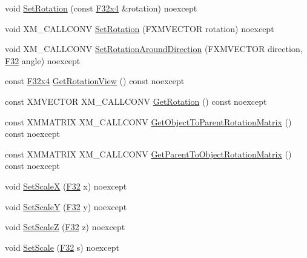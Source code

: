 \begin{DoxyCompactItemize}
\item 
void \mbox{\hyperlink{classmage_1_1_s_q_t_transform3_d_a63dfbd5a54920f65922bb3198043a79c}{Set\+Rotation}} (const \mbox{\hyperlink{namespacemage_a851648f37dfb126a2d2f973e102861ad}{F32x4}} \&rotation) noexcept
\item 
void X\+M\+\_\+\+C\+A\+L\+L\+C\+O\+NV \mbox{\hyperlink{classmage_1_1_s_q_t_transform3_d_aab4a582724596a859f5c338dcc9205d4}{Set\+Rotation}} (F\+X\+M\+V\+E\+C\+T\+OR rotation) noexcept
\item 
void X\+M\+\_\+\+C\+A\+L\+L\+C\+O\+NV \mbox{\hyperlink{classmage_1_1_s_q_t_transform3_d_aa0d6c5b3ab47a3b8c0f03edc41f93bc6}{Set\+Rotation\+Around\+Direction}} (F\+X\+M\+V\+E\+C\+T\+OR direction, \mbox{\hyperlink{namespacemage_aa97e833b45f06d60a0a9c4fc22ae02c0}{F32}} angle) noexcept
\item 
const \mbox{\hyperlink{namespacemage_a851648f37dfb126a2d2f973e102861ad}{F32x4}} \mbox{\hyperlink{classmage_1_1_s_q_t_transform3_d_ae7d2f97b41f53c23919e208bfd92f2d9}{Get\+Rotation\+View}} () const noexcept
\item 
const X\+M\+V\+E\+C\+T\+OR X\+M\+\_\+\+C\+A\+L\+L\+C\+O\+NV \mbox{\hyperlink{classmage_1_1_s_q_t_transform3_d_a3acafbb5ecfcf107b727d88f59442df0}{Get\+Rotation}} () const noexcept
\item 
const X\+M\+M\+A\+T\+R\+IX X\+M\+\_\+\+C\+A\+L\+L\+C\+O\+NV \mbox{\hyperlink{classmage_1_1_s_q_t_transform3_d_a68021401316fcfa6a2c80913edd13253}{Get\+Object\+To\+Parent\+Rotation\+Matrix}} () const noexcept
\item 
const X\+M\+M\+A\+T\+R\+IX X\+M\+\_\+\+C\+A\+L\+L\+C\+O\+NV \mbox{\hyperlink{classmage_1_1_s_q_t_transform3_d_a1cafde2eb0c314245d9be42703adda45}{Get\+Parent\+To\+Object\+Rotation\+Matrix}} () const noexcept
\item 
void \mbox{\hyperlink{classmage_1_1_s_q_t_transform3_d_a02ad0bda32f6f6dbee8c085133404c5e}{Set\+ScaleX}} (\mbox{\hyperlink{namespacemage_aa97e833b45f06d60a0a9c4fc22ae02c0}{F32}} x) noexcept
\item 
void \mbox{\hyperlink{classmage_1_1_s_q_t_transform3_d_afbbf32e1e79478d5be5f78dc07a1ab64}{Set\+ScaleY}} (\mbox{\hyperlink{namespacemage_aa97e833b45f06d60a0a9c4fc22ae02c0}{F32}} y) noexcept
\item 
void \mbox{\hyperlink{classmage_1_1_s_q_t_transform3_d_a84cbecec5d0abcbbeeae1a6ed4c09239}{Set\+ScaleZ}} (\mbox{\hyperlink{namespacemage_aa97e833b45f06d60a0a9c4fc22ae02c0}{F32}} z) noexcept
\item 
void \mbox{\hyperlink{classmage_1_1_s_q_t_transform3_d_a992a620456265260a3a440d4c6967895}{Set\+Scale}} (\mbox{\hyperlink{namespacemage_aa97e833b45f06d60a0a9c4fc22ae02c0}{F32}} s) noexcept

\end{DoxyCompactItemize}

